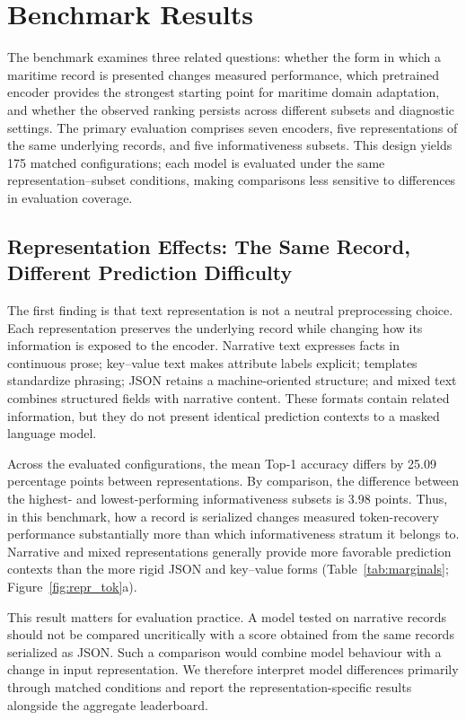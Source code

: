 \section{Benchmark Results}
\label{sec:results}

The benchmark examines three related questions: whether the form in which a maritime record is presented changes measured performance, which pretrained encoder provides the strongest starting point for maritime domain adaptation, and whether the observed ranking persists across different subsets and diagnostic settings. The primary evaluation comprises seven encoders, five representations of the same underlying records, and five informativeness subsets. This design yields 175 matched configurations; each model is evaluated under the same representation--subset conditions, making comparisons less sensitive to differences in evaluation coverage.

\subsection{Representation Effects: The Same Record, Different Prediction Difficulty}
\label{sec:repr}


The first finding is that text representation is not a neutral preprocessing choice. Each representation preserves the underlying record while changing how its information is exposed to the encoder. Narrative text expresses facts in continuous prose; key--value text makes attribute labels explicit; templates standardize phrasing; JSON retains a machine-oriented structure; and mixed text combines structured fields with narrative content. These formats contain related information, but they do not present identical prediction contexts to a masked language model.

Across the evaluated configurations, the mean Top-1 accuracy differs by 25.09 percentage points between representations. By comparison, the difference between the highest- and lowest-performing informativeness subsets is 3.98 points. Thus, in this benchmark, how a record is serialized changes measured token-recovery performance substantially more than which informativeness stratum it belongs to. Narrative and mixed representations generally provide more favorable prediction contexts than the more rigid JSON and key--value forms (Table~\ref{tab:marginals}; Figure~\ref{fig:repr_tok}a).

This result matters for evaluation practice. A model tested on narrative records should not be compared uncritically with a score obtained from the same records serialized as JSON. Such a comparison would combine model behaviour with a change in input representation. We therefore interpret model differences primarily through matched conditions and report the representation-specific results alongside the aggregate leaderboard.

